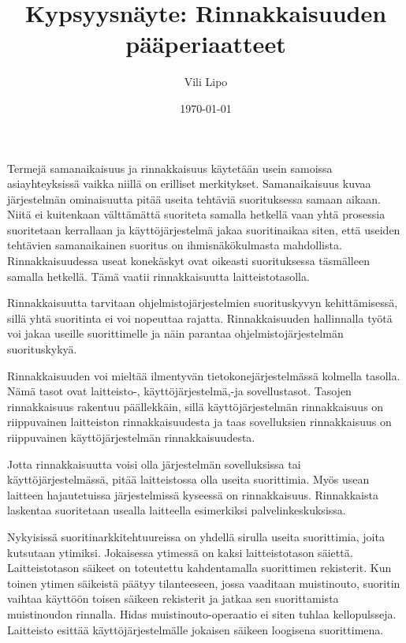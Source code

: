 \documentclass[a4paper, 12pt]{article}
\author{ Vili Lipo}
\title{Kypsyysnäyte: Rinnakkaisuuden pääperiaatteet}
\date{\today}
\begin{document}
\maketitle
\newpage

Termejä samanaikaisuus ja rinnakkaisuus käytetään
usein samoissa asiayhteyksissä vaikka niillä on erilliset merkitykset.
Samanaikaisuus kuvaa järjestelmän ominaisuutta pitää useita
tehtäviä suorituksessa samaan aikaan. Niitä ei kuitenkaan välttämättä
suoriteta samalla hetkellä vaan yhtä prosessia suoritetaan kerrallaan
ja käyttöjärjestelmä jakaa suoritinaikaa siten, että useiden
tehtävien samanaikainen suoritus on ihmisnäkökulmasta mahdollista.
Rinnakkaisuudessa useat konekäskyt ovat
oikeasti suorituksessa täsmälleen samalla hetkellä.
Tämä vaatii rinnakkaisuutta laitteistotasolla.

Rinnakkaisuutta tarvitaan ohjelmistojärjestelmien
suorituskyvyn kehittämisessä, sillä yhtä suoritinta
ei voi nopeuttaa rajatta. Rinnakkaisuuden hallinnalla
työtä voi jakaa useille suorittimelle ja näin 
parantaa ohjelmistojärjestelmän suorituskykyä.

Rinnakkaisuuden voi mieltää ilmentyvän tietokonejärjestelmässä
kolmella tasolla. Nämä tasot ovat laitteisto-, käyttöjärjestelmä,-ja sovellustasot.
Tasojen rinnakkaisuus rakentuu päällekkäin, sillä käyttöjärjestelmän rinnakkaisuus
on riippuvainen laitteiston rinnakkaisuudesta ja taas sovelluksien rinnakkaisuus
on riippuvainen käyttöjärjestelmän rinnakkaisuudesta.

Jotta rinnakkaisuutta voisi olla järjestelmän sovelluksissa tai käyttöjärjestelmässä,
pitää laitteistossa olla useita suorittimia.
Myös usean laitteen hajautetuissa järjestelmissä kyseessä on rinnakkaisuus.
Rinnakkaista laskentaa suoritetaan usealla laitteella
esimerkiksi palvelinkeskuksissa.


Nykyisissä suoritinarkkitehtuureissa on yhdellä sirulla useita suorittimia,
joita kutsutaan ytimiksi. Jokaisessa ytimessä on kaksi laitteistotason
säiettä.
Laitteistotason säikeet on toteutettu kahdentamalla suorittimen rekisterit.
Kun toinen ytimen säikeistä päätyy tilanteeseen, jossa vaaditaan muistinouto, suoritin
vaihtaa käyttöön toisen säikeen rekisterit ja jatkaa sen suorittamista 
muistinoudon rinnalla. Hidas muistinouto-operaatio 
ei siten tuhlaa kellopulsseja.
Laitteisto esittää käyttöjärjestelmälle jokaisen säikeen loogisena suorittimena.
\end{document}
